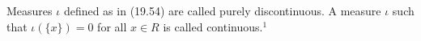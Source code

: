 Measures $\iota$ defined as in (19.54) are called purely discontinuous. A measure $\iota$ such that $\iota(\{x\}) = 0$ for all $x \in R$ is called continuous.$^1$